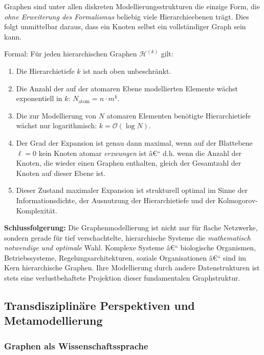 ﻿\documentclass[12pt,a4paper,twoside]{article}
\theoremstyle{definition}
\theoremstyle{plain}
\theoremstyle{remark}
\begin{document}
	\medskip
	\noindent
	Graphen sind unter allen diskreten Modellierungsstrukturen die
	einzige Form, die \emph{ohne Erweiterung des Formalismus}
	beliebig viele Hierarchieebenen trägt.  Dies folgt unmittelbar
	daraus, dass ein Knoten selbst ein vollständiger Graph sein kann.
	
	\medskip
	\noindent
	Formal: Für jeden hierarchischen Graphen $\mathcal{H}^{(k)}$
	gilt:
	\begin{enumerate}
		\item Die Hierarchietiefe $k$ ist nach oben unbeschränkt.
		\item Die Anzahl der auf der atomaren Ebene modellierten
		Elemente wächst exponentiell in $k$:
		$N_{\text{atom}} = n \cdot m^k$.
		\item Die zur Modellierung von $N$ atomaren Elementen benötigte
		Hierarchietiefe wächst nur logarithmisch:
		$k = \mathcal{O}(\log N)$.
		\item Der Grad der Expansion ist genau dann maximal, wenn
		auf der Blattebene $\ell = 0$ kein Knoten atomar
		\emph{erzwungen} ist â€“ d.h. wenn die Anzahl der Knoten,
		die wieder einen Graphen enthalten, gleich der
		Gesamtzahl der Knoten auf dieser Ebene ist.
		\item Dieser Zustand maximaler Expansion ist strukturell
		optimal im Sinne der Informationsdichte, der
		Ausnutzung der Hierarchietiefe und der
		Kolmogorov-Komplexität.
	\end{enumerate}
	
	\medskip
	\noindent
	\textbf{Schlussfolgerung:} Die Graphenmodellierung ist nicht
	nur für flache Netzwerke, sondern gerade für tief verschachtelte,
	hierarchische Systeme die \emph{mathematisch notwendige und optimale}
	Wahl.  Komplexe Systeme â€“ biologische Organismen, Betriebssysteme,
	Regelungsarchitekturen, soziale Organisationen â€“ sind im Kern
	hierarchische Graphen.  Ihre Modellierung durch andere
	Datenstrukturen ist stets eine verlustbehaftete Projektion
	dieser fundamentalen Graphstruktur.

\subsection{Transdisziplinäre Perspektiven und Metamodellierung}

\subsubsection{Graphen als Wissenschaftssprache}
\end{document}
